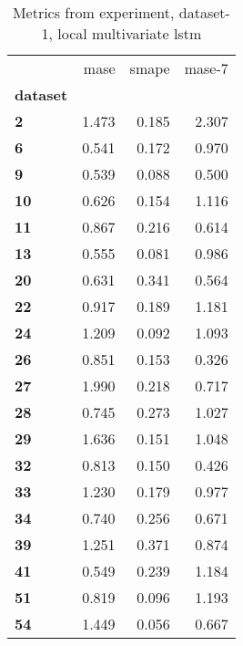 \begin{table}[h]
\centering
\caption{Metrics from experiment, dataset-1, local multivariate lstm}
\label{table:local-multivariate-lstm-dataset-1}
\begin{tabular}{lrrr}
\toprule
{} &   mase &  smape &  mase-7 \\
\textbf{dataset} &        &        &         \\
\midrule
\textbf{2      } &  1.473 &  0.185 &   2.307 \\
\textbf{6      } &  0.541 &  0.172 &   0.970 \\
\textbf{9      } &  0.539 &  0.088 &   0.500 \\
\textbf{10     } &  0.626 &  0.154 &   1.116 \\
\textbf{11     } &  0.867 &  0.216 &   0.614 \\
\textbf{13     } &  0.555 &  0.081 &   0.986 \\
\textbf{20     } &  0.631 &  0.341 &   0.564 \\
\textbf{22     } &  0.917 &  0.189 &   1.181 \\
\textbf{24     } &  1.209 &  0.092 &   1.093 \\
\textbf{26     } &  0.851 &  0.153 &   0.326 \\
\textbf{27     } &  1.990 &  0.218 &   0.717 \\
\textbf{28     } &  0.745 &  0.273 &   1.027 \\
\textbf{29     } &  1.636 &  0.151 &   1.048 \\
\textbf{32     } &  0.813 &  0.150 &   0.426 \\
\textbf{33     } &  1.230 &  0.179 &   0.977 \\
\textbf{34     } &  0.740 &  0.256 &   0.671 \\
\textbf{39     } &  1.251 &  0.371 &   0.874 \\
\textbf{41     } &  0.549 &  0.239 &   1.184 \\
\textbf{51     } &  0.819 &  0.096 &   1.193 \\
\textbf{54     } &  1.449 &  0.056 &   0.667 \\
\bottomrule
\end{tabular}
\end{table}
